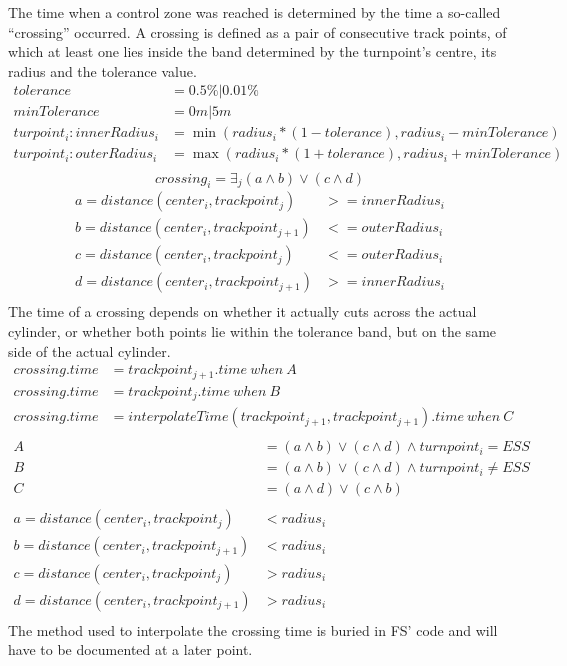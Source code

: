 \documentclass{article}
\begin{document}
The time when a control zone was reached is determined by the time a so-called “crossing” occurred. A
crossing is defined as a pair of consecutive track points, of which at least one lies inside the band
determined by the turnpoint’s centre, its radius and the tolerance value.
\begin{align*}
    tolerance &= 0.5\% | 0.01\% \\
    minTolerance &= 0m | 5m \\
    turpoint_i : innerRadius_i &= \min(radius_i * (1 - tolerance), radius_i - minTolerance) \\
    turpoint_i : outerRadius_i &= \max(radius_i * (1 + tolerance), radius_i + minTolerance) \\
\end{align*}
\begin{equation*}
    crossing_i = \exists_j (a \land b) \lor (c \land d)
\end{equation*}
\begin{align*}
    a = distance(center_i, trackpoint_j) &>= innerRadius_i \\
    b = distance(center_i, trackpoint_{j+1}) &<= outerRadius_i \\
    c = distance(center_i, trackpoint_j) &<= outerRadius_i \\
    d = distance(center_i, trackpoint_{j+1}) &>= innerRadius_i \\
\end{align*}
The time of a crossing depends on whether it actually cuts across the actual cylinder, or whether both
points lie within the tolerance band, but on the same side of the actual cylinder.
\begin{align*}
    crossing . time &= trackpoint_{j+1} . time \ when \ A \\
    crossing . time &= trackpoint_j . time \ when \ B \\
    crossing . time &= interpolateTime(trackpoint_{j+1}, trackpoint_{j+1}) . time \ when \ C \\
\end{align*}
\begin{align*}
    A &= (a \land b) \lor (c \land d) \land turnpoint_i = ESS \\
    B &= (a \land b) \lor (c \land d) \land turnpoint_i \neq ESS \\
    C &= (a \land d) \lor (c \land b) \\
    \\
    a = distance(center_i, trackpoint_j) &< radius_i \\
    b = distance(center_i, trackpoint_{j+1}) &< radius_i \\
    c = distance(center_i, trackpoint_j) &> radius_i \\
    d = distance(center_i, trackpoint_{j+1}) &> radius_i \\
\end{align*}
The method used to interpolate the crossing time is buried in FS’ code and will have to be documented
at a later point.
\end{document}
